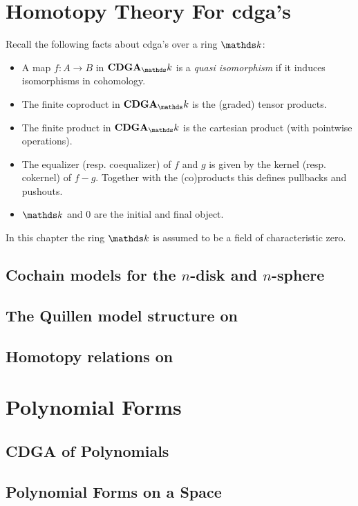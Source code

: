 
\chapter{Homotopy Theory For cdga's}

Recall the following facts about cdga's over a ring $\k$:
\begin{itemize}
	\item A map $f: A \to B$ in $\CDGA_\k$ is a \emph{quasi isomorphism} if it induces isomorphisms in cohomology.
	\item The finite coproduct in $\CDGA_\k$ is the (graded) tensor products.
	\item The finite product in $\CDGA_\k$ is the cartesian product (with pointwise operations).
	\item The equalizer (resp. coequalizer) of $f$ and $g$ is given by the kernel (resp. cokernel) of $f - g$. Together with the (co)products this defines pullbacks and pushouts.
	\item $\k$ and $0$ are the initial and final object.
\end{itemize}
In this chapter the ring $\k$ is assumed to be a field of characteristic zero.

\section{Cochain models for the $n$-disk and $n$-sphere}


\section{The Quillen model structure on \titleCDGA}


\section{Homotopy relations on \titleCDGA}



\chapter{Polynomial Forms}
\label{sec:cdga-of-polynomials}

\section{CDGA of Polynomials}


\section{Polynomial Forms on a Space}
\label{sec:polynomial-forms}





